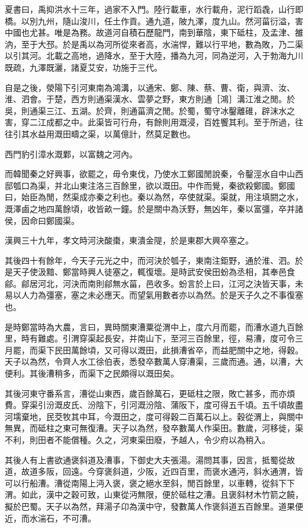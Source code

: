 夏書曰，禹抑洪水十三年，過家不入門。陸行載車，水行載舟，泥行蹈毳，山行即橋。以別九州，隨山浚川，任土作貢。通九道，陂九澤，度九山。然河菑衍溢，害中國也尤甚。唯是為務。故道河自積石歷龍門，南到華陰，東下砥柱，及孟津、雒汭，至于大邳。於是禹以為河所從來者高，水湍悍，難以行平地，數為敗，乃二渠以引其河。北載之高地，過降水，至于大陸，播為九河，同為逆河，入于勃海九川既疏，九澤既灑，諸夏艾安，功施于三代。

自是之後，滎陽下引河東南為鴻溝，以通宋、鄭、陳、蔡、曹、衛，與濟、汝、淮、泗會。于楚，西方則通渠漢水、雲夢之野，東方則通［鴻］溝江淮之閒。於吳，則通渠三江、五湖。於齊，則通菑濟之閒。於蜀，蜀守冰鑿離碓，辟沫水之害，穿二江成都之中。此渠皆可行舟，有餘則用溉浸，百姓饗其利。至于所過，往往引其水益用溉田疇之渠，以萬億計，然莫足數也。

西門豹引漳水溉鄴，以富魏之河內。

而韓聞秦之好興事，欲罷之，毋令東伐，乃使水工鄭國閒說秦，令鑿涇水自中山西邸瓠口為渠，并北山東注洛三百餘里，欲以溉田。中作而覺，秦欲殺鄭國。鄭國曰，始臣為閒，然渠成亦秦之利也。秦以為然，卒使就渠。渠就，用注填閼之水，溉澤鹵之地四萬餘頃，收皆畝一鐘。於是關中為沃野，無凶年，秦以富彊，卒并諸侯，因命曰鄭國渠。

漢興三十九年，孝文時河決酸棗，東潰金隄，於是東郡大興卒塞之。

其後四十有餘年，今天子元光之中，而河決於瓠子，東南注鉅野，通於淮、泗。於是天子使汲黯、鄭當時興人徒塞之，輒復壞。是時武安侯田蚡為丞相，其奉邑食鄃。鄃居河北，河決而南則鄃無水菑，邑收多。蚡言於上曰，江河之決皆天事，未易以人力為彊塞，塞之未必應天。而望氣用數者亦以為然。於是天子久之不事復塞也。

是時鄭當時為大農，言曰，異時關東漕粟從渭中上，度六月而罷，而漕水道九百餘里，時有難處。引渭穿渠起長安，并南山下，至河三百餘里，徑，易漕，度可令三月罷，而渠下民田萬餘頃，又可得以溉田，此損漕省卒，而益肥關中之地，得穀。天子以為然，令齊人水工徐伯表，悉發卒數萬人穿漕渠，三歲而通。通，以漕，大便利。其後漕稍多，而渠下之民頗得以溉田矣。

其後河東守番系言，漕從山東西，歲百餘萬石，更砥柱之限，敗亡甚多，而亦煩費。穿渠引汾溉皮氏、汾陰下，引河溉汾陰、蒲阪下，度可得五千頃。五千頃故盡河壖棄地，民茭牧其中耳，今溉田之，度可得穀二百萬石以上。穀從渭上，與關中無異，而砥柱之東可無復漕。天子以為然，發卒數萬人作渠田。數歲，河移徙，渠不利，則田者不能償種。久之，河東渠田廢，予越人，令少府以為稍入。

其後人有上書欲通褒斜道及漕事，下御史大夫張湯。湯問其事，因言，抵蜀從故道，故道多阪，回遠。今穿褒斜道，少阪，近四百里，而褒水通沔，斜水通渭，皆可以行船漕。漕從南陽上沔入褒，褒之絕水至斜，閒百餘里，以車轉，從斜下下渭。如此，漢中之穀可致，山東從沔無限，便於砥柱之漕。且褒斜材木竹箭之饒，擬於巴蜀。天子以為然，拜湯子卬為漢中守，發數萬人作褒斜道五百餘里。道果便近，而水湍石，不可漕。

